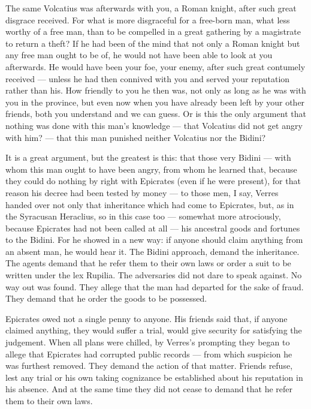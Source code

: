  The same Volcatius was afterwards with you, a Roman knight, after such great disgrace received. For what is more disgraceful for a free-born man, what less worthy of a free man, than to be compelled in a great gathering by a magistrate to return a theft? If he had been of the mind that not only a Roman knight but any free man ought to be of, he would not have been able to look at you afterwards. He would have been your foe, your enemy, after such great contumely received --- unless he had then connived with you and served your reputation rather than his. How friendly to you he then was, not only as long as he was with you in the province, but even now when you have already been left by your other friends, both you understand and we can guess. Or is this the only argument that nothing was done with this man's knowledge --- that Volcatius did not get angry with him? --- that this man punished neither Volcatius nor the Bidini?

 It is a great argument, but the greatest is this: that those very Bidini --- with whom this man ought to have been angry, from whom he learned that, because they could do nothing by right with Epicrates (even if he were present), for that reason his decree had been tested by money --- to those men, I say, Verres handed over not only that inheritance which had come to Epicrates, but, as in the Syracusan Heraclius, so in this case too --- somewhat more atrociously, because Epicrates had not been called at all --- his ancestral goods and fortunes to the Bidini. For he showed in a new way: if anyone should claim anything from an absent man, he would hear it. The Bidini approach, demand the inheritance. The agents demand that he refer them to their own laws or order a suit to be written under the lex Rupilia. The adversaries did not dare to speak against. No way out was found. They allege that the man had departed for the sake of fraud. They demand that he order the goods to be possessed.

 Epicrates owed not a single penny to anyone. His friends said that, if anyone claimed anything, they would suffer a trial, would give security for satisfying the judgement. When all plans were chilled, by Verres's prompting they began to allege that Epicrates had corrupted public records --- from which suspicion he was furthest removed. They demand the action of that matter. Friends refuse, lest any trial or his own taking cognizance be established about his reputation in his absence. And at the same time they did not cease to demand that he refer them to their own laws.

